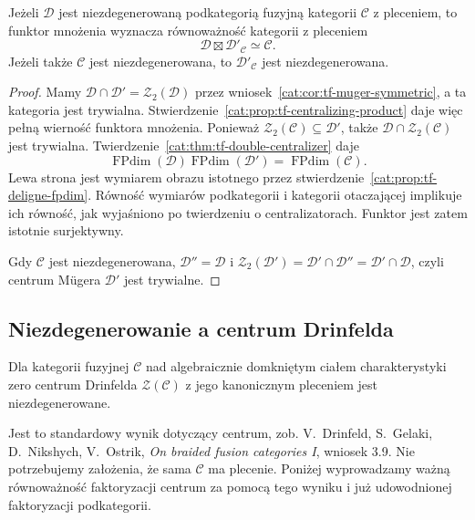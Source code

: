 \begin{twierdzenie}\label{cat:thm:tf-muger-factorization}
Jeżeli $\mathcal D$ jest niezdegenerowaną podkategorią fuzyjną kategorii $\mathcal C$ z pleceniem, to funktor mnożenia wyznacza równoważność kategorii z pleceniem
\[
 \mathcal D\boxtimes\mathcal D'_{\mathcal C}\simeq\mathcal C.
\]
Jeżeli także $\mathcal C$ jest niezdegenerowana, to $\mathcal D'_{\mathcal C}$ jest niezdegenerowana.
\end{twierdzenie}
\begin{proof}
Mamy $\mathcal D\cap\mathcal D'=\mathcal Z_2(\mathcal D)$ przez wniosek~\ref{cat:cor:tf-muger-symmetric}, a ta kategoria jest trywialna. Stwierdzenie~\ref{cat:prop:tf-centralizing-product} daje więc pełną wierność funktora mnożenia. Ponieważ $\mathcal Z_2(\mathcal C)\subseteq\mathcal D'$, także $\mathcal D\cap\mathcal Z_2(\mathcal C)$ jest trywialna. Twierdzenie~\ref{cat:thm:tf-double-centralizer} daje
\[
 \operatorname{FPdim}(\mathcal D)\operatorname{FPdim}(\mathcal D')
 =\operatorname{FPdim}(\mathcal C).
\]
Lewa strona jest wymiarem obrazu istotnego przez stwierdzenie~\ref{cat:prop:tf-deligne-fpdim}. Równość wymiarów podkategorii i kategorii otaczającej implikuje ich równość, jak wyjaśniono po twierdzeniu o centralizatorach. Funktor jest zatem istotnie surjektywny.

Gdy $\mathcal C$ jest niezdegenerowana, $\mathcal D''=\mathcal D$ i $\mathcal Z_2(\mathcal D')=\mathcal D'\cap\mathcal D''=\mathcal D'\cap\mathcal D$, czyli centrum Mügera $\mathcal D'$ jest trywialne.
\end{proof}

\subsection{Niezdegenerowanie a centrum Drinfelda}

\begin{twierdzenie}\label{cat:thm:tf-center-nondegenerate}
Dla kategorii fuzyjnej $\mathcal C$ nad algebraicznie domkniętym ciałem charakterystyki zero centrum Drinfelda $\mathcal Z(\mathcal C)$ z jego kanonicznym pleceniem jest niezdegenerowane.
\end{twierdzenie}

Jest to standardowy wynik dotyczący centrum, zob. V.~Drinfeld, S.~Gelaki, D.~Nikshych, V.~Ostrik, \emph{On braided fusion categories I}, wniosek 3.9. Nie potrzebujemy założenia, że sama $\mathcal C$ ma plecenie. Poniżej wyprowadzamy ważną równoważność faktoryzacji centrum za pomocą tego wyniku i już udowodnionej faktoryzacji podkategorii.

